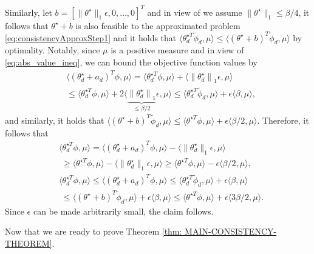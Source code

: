 \begin{pf}
Similarly, let $b = [ \|\theta^\star\|_1 \epsilon, 0, \ldots, 0]^T$ and in view of we assume $\|\theta^\star\|_1\le \beta/4$, it follows that $\theta^\star + b$ is also feasible to the approximated problem \eqref{eq:consistencyApproxStep1} and it holds that $\langle \theta_{d}^{\star T} \tilde{\phi}_d, \mu \rangle  \leq \langle (\theta^\star+b)^T \tilde{\phi}_d, \mu \rangle$ by optimality.
Notably, since $\mu$ is a positive measure and in view of \eqref{eq:abs_value_ineq}, 
we can bound the objective function values by
\begin{equation*}
    \begin{aligned}
        &\langle (\theta_{d}^\star  + a_d)^T \phi, \mu \rangle = \langle \theta_{d}^{\star T} \phi, \mu \rangle + \langle \left\|\theta_{d}^\star \right\|_1\epsilon, \mu \rangle \\
        &\le \langle \theta_{d}^{\star T} \phi, \mu \rangle \!+\! 2\langle \underbrace{\left\|\theta_{d}^\star \right\|_1}_{\le \beta/2}\epsilon, \mu \rangle\leq \langle \theta_{d}^{\star T} \tilde{\phi}_d, \mu \rangle \!+\! \epsilon\langle \beta, \mu \rangle,
    \end{aligned}
\end{equation*}
and similarly, it holds that $\langle (\theta^\star + b)^T \tilde{\phi}_d, \mu \rangle \leq \langle \theta^{\star T} \phi, \mu \rangle + \epsilon\langle \beta/2, \mu \rangle$.
Therefore, it follows that
\begin{align*}
    &\langle\theta_{d}^{\star T}\phi,\mu \rangle = \langle (\theta_{d}^\star  + a_d)^T \phi, \mu \rangle - \langle \|\theta_{d}^\star \|_1 \epsilon, \mu \rangle\\
    &\;\geq \langle \theta^{\star T} \phi, \mu \rangle - \langle \|\theta_{d}^\star \|_1 \epsilon, \mu \rangle
    \geq \langle \theta^{\star T} \phi, \mu \rangle - \epsilon\langle \beta/2, \mu \rangle,\\
    &\langle\theta_{d}^{\star T}\phi,\mu \rangle\!\le\!\langle (\theta_{d}^\star  + a_d)^T \phi, \mu \rangle\!\leq\!\langle \theta_{d}^{\star T} \tilde{\phi}_d, \mu \rangle + \epsilon\langle \beta, \mu \rangle\\
    &\;\leq \langle (\theta^\star\! +\! b)^T \tilde{\phi}_d, \mu \rangle \!+\! \epsilon\langle \beta, \mu \rangle\!\leq\! \langle \theta^{\star T} \phi, \mu \rangle \!+\! \epsilon\langle 3 \beta/2, \mu \rangle.
\end{align*}
Since $\epsilon$ can be made arbitrarily small, the claim follows.
\end{pf}
Now that we are ready to prove Theorem \ref{thm: MAIN-CONSISTENCY-THEOREM}.
